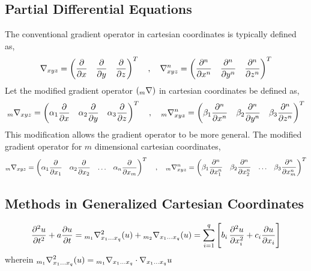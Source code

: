 \documentclass[a4paper, 12pt]{report}
\begin{document}
\begin{center}

\chapter{Partial Differential Equations}
\begin{comment}
Currently, only discussions of the Sturm -Liouville, the other applications are placed elsewhere, such as Physics Archives or Fluid Archives
modified gradient operators need to be revised very closely!!!!!!
\end{comment}
The conventional gradient operator in cartesian coordinates is typically defined as,
$$\nabla_{xyz} = \begin{pmatrix}\displaystyle{\frac{\partial}{\partial x}} & \displaystyle{\frac{\partial}{\partial y}} & \displaystyle{\frac{\partial}{\partial z}}\end{pmatrix}^T\quad,\quad \nabla^n_{xyz} = \begin{pmatrix}\displaystyle{\frac{\partial^n}{\partial x^n}} & \displaystyle{\frac{\partial^n}{\partial y^n}} & \displaystyle{\frac{\partial^n}{\partial z^n}}\end{pmatrix}^T$$
Let the modified gradient operator $\displaystyle{({}_{m}\nabla)}$ in cartesian coordinates be defined as,
$${}_{m}\nabla_{xyz} = \begin{pmatrix}\displaystyle{\alpha_1\frac{\partial}{\partial x}} & \displaystyle{\alpha_2\frac{\partial}{\partial y}} & \displaystyle{\alpha_3\frac{\partial}{\partial z}}\end{pmatrix}^T\quad,\quad {}_{m}\nabla^n_{xyz} = \begin{pmatrix}\displaystyle{\beta_1\frac{\partial^n}{\partial x^n}} & \displaystyle{\beta_2\frac{\partial^n}{\partial y^n}} & \displaystyle{\beta_3\frac{\partial^n}{\partial z^n}}\end{pmatrix}^T$$
This modification allows the gradient operator to be more general. The modified gradient operator for $m$ dimensional cartesian coordinates,
$${}_{m}\nabla_{xyz} = \begin{pmatrix}\displaystyle{\alpha_1\frac{\partial}{\partial x_1}} & \displaystyle{\alpha_2\frac{\partial}{\partial x_2}} & \dots & \displaystyle{\alpha_n\frac{\partial}{\partial x_m}}\end{pmatrix}^T\quad,\quad {}_{m}\nabla^n_{xyz} = \begin{pmatrix}\displaystyle{\beta_1\frac{\partial^n}{\partial x_1^n}} & \displaystyle{\beta_2\frac{\partial^n}{\partial x_2^n}} & \dots & \displaystyle{\beta_3\frac{\partial^n}{\partial x_m^n}}\end{pmatrix}^T$$
\section{Methods in Generalized Cartesian Coordinates}
\begin{comment}
Massive Fault in Theoretical Understanding. IN NEED OF EXTREME REVISION
\end{comment}
$$\frac{\partial^2u}{\partial t^2} + a\frac{\partial u}{\partial t} = {}_{m_1}\nabla^2_{x_1\dots x_q}(u) + {}_{m_2}\nabla_{x_1\dots x_q}(u) = \sum^{q}_{i=1}\left[b_i\,\frac{\partial^2u}{\partial x^2_{i}} + c_i\frac{\partial u}{\partial x_{i}}\right]$$
wherein $\displaystyle{{}_{m_1}\nabla^2_{x_1\dots x_q}(u) = {}_{m_1}\nabla_{x_1\dots x_q} \cdot\nabla_{x_1\dots x_q}u}$

\end{center}
\end{document}
